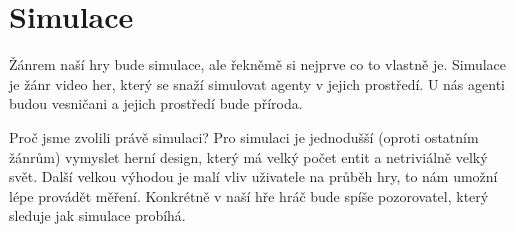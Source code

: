 \section{Simulace}
Žánrem naší hry bude simulace, ale řekněmě si nejprve co to vlastně je. Simulace je žánr video her, který se snaží simulovat agenty v jejich prostředí. U nás agenti budou vesničani a jejich prostředí bude příroda.

Proč jsme zvolili právě simulaci? Pro simulaci je jednodušší (oproti ostatním žánrům) vymyslet herní design, který má velký počet entit a netriviálně velký svět. Další velkou výhodou je malí vliv uživatele na průběh hry, to nám umožní lépe provádět měření. Konkrétně v naší hře hráč bude spíše pozorovatel, který sleduje jak simulace probíhá.

